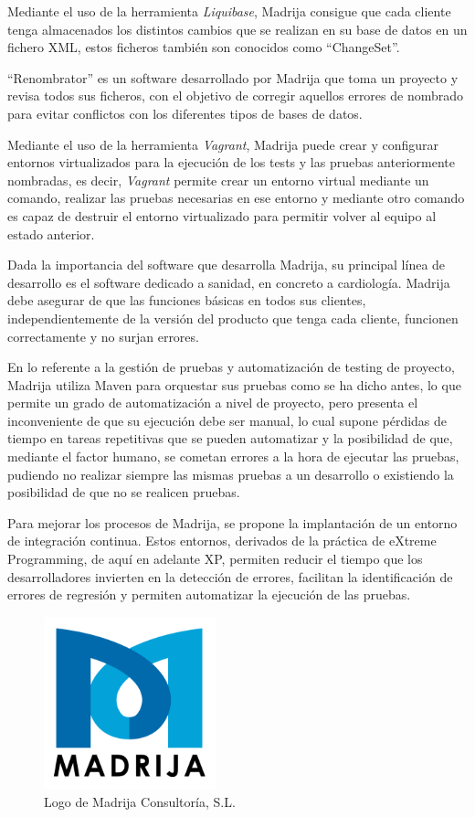 Mediante el uso de la herramienta \textit{Liquibase}, \ac{Madrija} consigue que cada cliente tenga almacenados los distintos cambios que se realizan en su base de datos en un fichero XML, estos ficheros también son conocidos como ``ChangeSet''.

\clearpage

``Renombrator'' es un software desarrollado por \ac{Madrija} que toma un proyecto y revisa todos sus ficheros, con el objetivo de corregir aquellos errores de nombrado para evitar conflictos con los diferentes tipos de bases de datos.

Mediante el uso de la herramienta \textit{Vagrant}, \ac{Madrija} puede crear y configurar entornos virtualizados para la ejecución de los tests y las pruebas anteriormente nombradas, es decir, \textit{Vagrant} permite crear un entorno virtual mediante un comando, realizar las pruebas necesarias en ese entorno y mediante otro comando es capaz de destruir el entorno virtualizado para permitir volver al equipo al estado anterior.

Dada la importancia del software que desarrolla \ac{Madrija}, su principal línea de desarrollo es el software dedicado a sanidad, en concreto a cardiología. \ac{Madrija} debe asegurar de que las funciones básicas en todos sus clientes, independientemente de la versión del producto que tenga cada cliente, funcionen correctamente y no surjan errores.

En lo referente a la gestión de pruebas y automatización de testing de proyecto, \ac{Madrija} utiliza Maven para orquestar sus pruebas como se ha dicho antes, lo que permite un grado de automatización a nivel de proyecto, pero presenta el inconveniente de que su ejecución debe ser manual, lo cual supone pérdidas de tiempo en tareas repetitivas que se pueden automatizar y la posibilidad de que, mediante el factor humano, se cometan errores a la hora de ejecutar las pruebas, pudiendo no realizar siempre las mismas pruebas a un desarrollo o existiendo la posibilidad de que no se realicen pruebas.

Para mejorar los procesos de \ac{Madrija}, se propone la implantación de un  entorno de integración continua\cite{IC}. Estos entornos, derivados de la práctica de eXtreme Programming\cite{XP}, de aquí en adelante \ac{XP}, permiten reducir el tiempo que los desarrolladores invierten en la detección de errores, facilitan la identificación de errores de regresión y permiten automatizar la ejecución de las pruebas.

\begin{figure}[!h]
\centering
   \includegraphics[width=5cm]{Logo_Madrija.png}
\caption{Logo de Madrija Consultoría, S.L.}
\end{figure}

